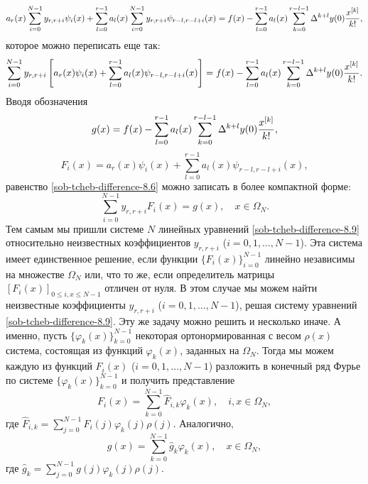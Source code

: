 \begin{equation*}
a_r(x) \sum_{i=0}^{N-1} y_{r,r+i} \psi_{i}(x)+
\sum_{l=0}^{r-1}a_l(x)\sum_{i=0}^{N-1} y_{r,r+i} \psi_{r-l,r-l+i}(x)=
f(x)-\sum_{l=0}^{r-1}a_l(x)\sum_{k=0}^{r-l-1}\Delta^{k+l}y(0){x^{[k]}\over k!},
\end{equation*}
которое можно переписать еще так:
\begin{equation}\label{sob-tcheb-difference-8.6}
\sum_{i=0}^{N-1} y_{r,r+i}\left[a_r(x) \psi_{i}(x)+ \sum_{l=0}^{r-1}a_l(x) \psi_{r-l,r-l+i}(x)\right]=
f(x)-\sum_{l=0}^{r-1}a_l(x)\sum_{k=0}^{r-l-1}\Delta^{k+l}y(0){x^{[k]}\over k!}.
\end{equation}
Вводя обозначения
\begin{equation}\label{sob-tcheb-difference-8.7}
g(x)=f(x)-\sum_{l=0}^{r-1}a_l(x)\sum_{k=0}^{r-l-1}\Delta^{k+l}y(0){x^{[k]}\over k!},
\end{equation}
\begin{equation}\label{sob-tcheb-difference-8.8}
F_i(x)=a_r(x) \psi_{i}(x)+ \sum_{l=0}^{r-1}a_l(x) \psi_{r-l,r-l+i}(x),
\end{equation}
равенство \eqref{sob-tcheb-difference-8.6} можно записать в более компактной форме:
 \begin{equation}\label{sob-tcheb-difference-8.9}
 \sum_{i=0}^{N-1} y_{r,r+i}F_i(x)=g(x), \quad x\in \Omega_N.
  \end{equation}
Тем самым мы пришли  системе $N$ линейных уравнений \eqref{sob-tcheb-difference-8.9} относительно неизвестных коэффициентов $y_{r,r+i}$ ($i=0,1,\ldots, N-1$). Эта система имеет единственное решение, если функции $\{F_i(x)\}_{i=0}^{N-1}$ линейно независимы на множестве $\Omega_N$ или, что то же, если определитель матрицы $[F_i(x)]_{0\le i,x\le N-1}$ отличен от нуля. В этом случае мы можем найти неизвестные коэффициенты $y_{r,r+i}$ ($i=0,1,\ldots, N-1$), решая систему уравнений \eqref{sob-tcheb-difference-8.9}. Эту же задачу можно решить и несколько иначе. А именно, пусть $\{\varphi_k(x)\}_{k=0}^{N-1}$ некоторая ортонормированная с весом $\rho(x)$ система, состоящая из функций $\varphi_k(x)$, заданных на $\Omega_N$. Тогда мы можем каждую из функций $F_i(x)$ ($i=0,1,\ldots, N-1$) разложить в конечный ряд Фурье по системе $\{\varphi_k(x)\}_{k=0}^{N-1}$ и получить представление
 \begin{equation}\label{sob-tcheb-difference-8.10}
F_i(x)= \sum_{k=0}^{N-1}\hat F_{i,k}\varphi_k(x), \quad i, x\in \Omega_N,
  \end{equation}
где $\hat F_{i,k}= \sum_{j=0}^{N-1} F_{i}(j)\varphi_k(j)\rho(j)$.
Аналогично,
\begin{equation}\label{sob-tcheb-difference-8.12}
g(x)= \sum_{k=0}^{N-1}\hat g_{k}\varphi_k(x), \quad  x\in \Omega_N,
  \end{equation}
где $\hat g_{k}= \sum_{j=0}^{N-1} g(j)\varphi_k(j)\rho(j)$.

